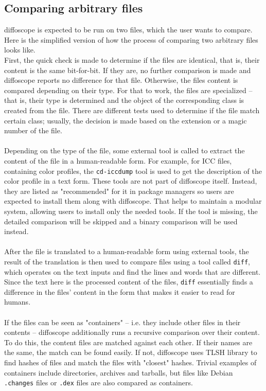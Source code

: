 \subsection[Comparing arbitrary files]{Comparing arbitrary files}

diffoscope is expected to be run on two files, which the user wants to compare. Here is the simplified version of how the process of comparing two arbitrary files looks like.\\
First, the quick check is made to determine if the files are identical, that is, their content is the same bit-for-bit. If they are, no further comparison is made and diffoscope reports no difference for that file. 
Otherwise, the files content is compared depending on their type. For that to work, the files are specialized -- that is, their type is determined and the object of the corresponding class is created from the file. There are different tests used to determine if the file match certain class; usually, the decision is made based on the extension or a magic number of the file.\\\\
Depending on the type of the file, some external tool is called to extract the content of the file in a human-readable form. For example, for ICC files, containing color profiles, the \texttt{cd-iccdump} tool is used to get the description of the color profile in a text form. These tools are not part of diffoscope itself. Instead, they are listed as "recommended" for it in package managers so users are expected to install them along with diffoscope. That helps to maintain a modular system, allowing users to install only the needed tools. If the tool is missing, the detailed comparison will be skipped and a binary comparison will be used instead.\\\\
After the file is translated to a human-readable form using external tools, the result of the translation is then used to compare files using a tool called \texttt{diff}, which operates on the text inputs and find the lines and words that are different. Since the text here is the processed content of the files, \texttt{diff} essentially finds a difference in the files' content in the form that makes it easier to read for humans.\\\\
If the files can be seen as "containers" -- i.e. they include other files in their contents -- diffoscope additionally runs a recursive comparison over their content. To do this, the content files are matched against each other. If their names are the same, the match can be found easily. If not, diffoscope uses TLSH library\autocite{oliver2013tlsh} to find hashes of files and match the files with "closest" hashes. Trivial examples of containers include directories, archives and tarballs, but files like Debian \texttt{.changes} files or \texttt{.dex} files are also compared as containers.\\\\
